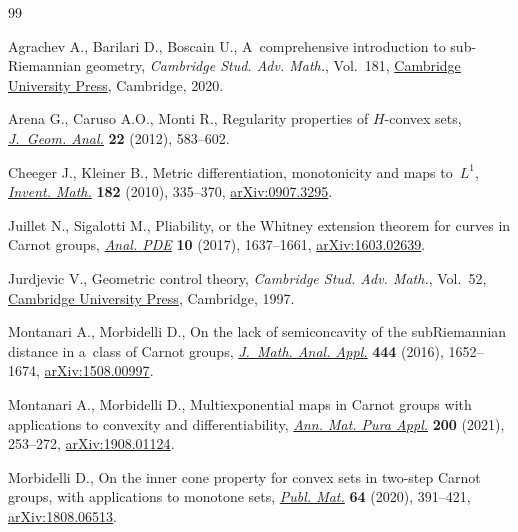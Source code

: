 \begin{thebibliography}{99}
\footnotesize\itemsep=0pt

Agrachev A., Barilari D., Boscain U., A~comprehensive introduction to
 sub-{R}iemannian geometry, \textit{Cambridge Stud. Adv. Math.}, Vol.~181,
 \href{https://doi.org/10.1017/9781108677325}{Cambridge University Press},
 Cambridge, 2020.

Arena G., Caruso A.O., Monti R., Regularity properties of {$H$}-convex sets,
 \href{https://doi.org/10.1007/s12220-010-9203-7}{\textit{J.~Geom. Anal.}}
 \textbf{22} (2012), 583--602.

Cheeger J., Kleiner B., Metric differentiation, monotonicity and maps
 to~{$L^1$}, \href{https://doi.org/10.1007/s00222-010-0264-9}{\textit{Invent.
 Math.}} \textbf{182} (2010), 335--370,
 \href{http://arxiv.org/abs/0907.3295}{arXiv:0907.3295}.

Juillet N., Sigalotti M., Pliability, or the {W}hitney extension theorem for
 curves in {C}arnot groups,
 \href{https://doi.org/10.2140/apde.2017.10.1637}{\textit{Anal. {PDE}}}
 \textbf{10} (2017), 1637--1661,
 \href{http://arxiv.org/abs/1603.02639}{arXiv:1603.02639}.

Jurdjevic V., Geometric control theory, \textit{Cambridge Stud. Adv. Math.},
 Vol.~52, \href{https://doi.org/10.1017/CBO9780511530036}{Cambridge University
 Press}, Cambridge, 1997.

Montanari A., Morbidelli D., On the lack of semiconcavity of the
 sub{R}iemannian distance in a~class of {C}arnot groups,
 \href{https://doi.org/10.1016/j.jmaa.2016.07.032}{\textit{J.~Math. Anal.
 Appl.}} \textbf{444} (2016), 1652--1674,
 \href{http://arxiv.org/abs/1508.00997}{arXiv:1508.00997}.

Montanari A., Morbidelli D., Multiexponential maps in {C}arnot groups with
 applications to convexity and differentiability,
 \href{https://doi.org/10.1007/s10231-020-00994-3}{\textit{Ann. Mat. Pura
 Appl.}} \textbf{200} (2021), 253--272,
 \href{http://arxiv.org/abs/1908.01124}{arXiv:1908.01124}.

Morbidelli D., On the inner cone property for convex sets in two-step {C}arnot
 groups, with applications to monotone sets,
 \href{https://doi.org/10.5565/PUBLMAT6422002}{\textit{Publ. Mat.}}
 \textbf{64} (2020), 391--421,
 \href{http://arxiv.org/abs/1808.06513}{arXiv:1808.06513}.


\end{thebibliography}

